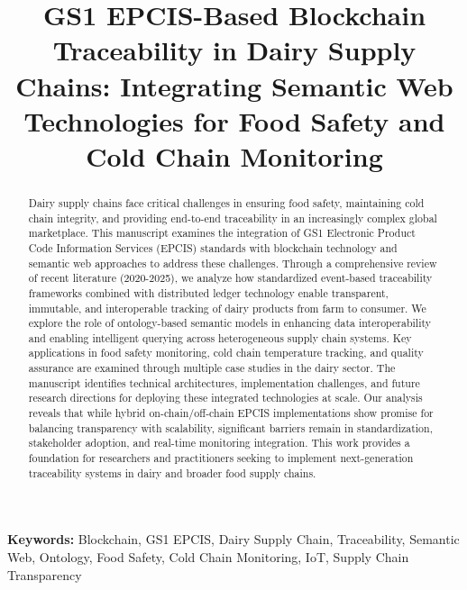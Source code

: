 \documentclass[12pt,a4paper]{article}
\title{\textbf{GS1 EPCIS-Based Blockchain Traceability in Dairy Supply Chains: Integrating Semantic Web Technologies for Food Safety and Cold Chain Monitoring}}
\author{}
\date{}
\begin{document}
\maketitle

\begin{abstract}
\noindent
Dairy supply chains face critical challenges in ensuring food safety, maintaining cold chain integrity, and providing end-to-end traceability in an increasingly complex global marketplace. This manuscript examines the integration of GS1 Electronic Product Code Information Services (EPCIS) standards with blockchain technology and semantic web approaches to address these challenges. Through a comprehensive review of recent literature (2020-2025), we analyze how standardized event-based traceability frameworks combined with distributed ledger technology enable transparent, immutable, and interoperable tracking of dairy products from farm to consumer. We explore the role of ontology-based semantic models in enhancing data interoperability and enabling intelligent querying across heterogeneous supply chain systems. Key applications in food safety monitoring, cold chain temperature tracking, and quality assurance are examined through multiple case studies in the dairy sector. The manuscript identifies technical architectures, implementation challenges, and future research directions for deploying these integrated technologies at scale. Our analysis reveals that while hybrid on-chain/off-chain EPCIS implementations show promise for balancing transparency with scalability, significant barriers remain in standardization, stakeholder adoption, and real-time monitoring integration. This work provides a foundation for researchers and practitioners seeking to implement next-generation traceability systems in dairy and broader food supply chains.
\end{abstract}

\vspace{0.5cm}
\noindent\textbf{Keywords:} Blockchain, GS1 EPCIS, Dairy Supply Chain, Traceability, Semantic Web, Ontology, Food Safety, Cold Chain Monitoring, IoT, Supply Chain Transparency

\newpage

\tableofcontents

\newpage











\newpage

\end{document}
